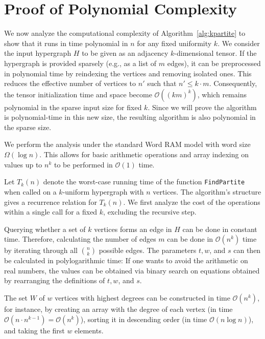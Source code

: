 \documentclass{amsart}
\newcommand{\bigO}[1]{\ensuremath{\mathcal{O}\left(#1\right)}}
\begin{document}
    \section{Proof of Polynomial Complexity}\label{sec:complexity}

    We now analyze the computational complexity of Algorithm~\ref{alg:kpartite} to show that it runs in time polynomial in $n$ for any fixed uniformity $k$.
    We consider the input hypergraph $H$ to be given as an adjacency $k$-dimensional tensor.
    If the hypergraph is provided sparsely (e.g., as a list of $m$ edges), it can be preprocessed in polynomial time by reindexing the vertices and removing isolated ones.
    This reduces the effective number of vertices to $n'$ such that $n' \le k \cdot m$.
    Consequently, the tensor initialization time and space become $\bigO{(km)^k}$, which remains polynomial in the sparse input size for fixed $k$.
    Since we will prove the algorithm is polynomial-time in this new size, the resulting algorithm is also polynomial in the sparse size.

    We perform the analysis under the standard Word RAM model with word size $\Omega(\log n)$.
    This allows for basic arithmetic operations and array indexing on values up to $n^k$ to be performed in $\bigO{1}$ time.

    Let $T_k(n)$ denote the worst-case running time of the function \texttt{FindPartite} when called on a $k$-uniform hypergraph with $n$ vertices.
    The algorithm's structure gives a recurrence relation for $T_k(n)$.
    We first analyze the cost of the operations within a single call for a fixed $k$, excluding the recursive step.

    Querying whether a set of $k$ vertices forms an edge in $H$ can be done in constant time.
    Therefore, calculating the number of edges $m$ can be done in $\bigO{n^k}$ time by iterating through all $\binom{n}{k}$ possible edges.
    The parameters $t, w$, and $s$ can then be calculated in polylogarithmic time: If one wants to avoid the arithmetic on real
    numbers, the values can be obtained via binary search on equations obtained by rearranging the definitions of $t, w$, and $s$.

    The set $W$ of $w$ vertices with highest degrees can be constructed in time $\bigO{n^k}$, for instance, by
    creating an array with the degree of each vertex (in time  $\bigO{n \cdot n^{k-1}} = \bigO{n^k}$),
    sorting it in descending order (in time $\bigO{n \log n}$),
    and taking the first $w$ elements.
\end{document}
